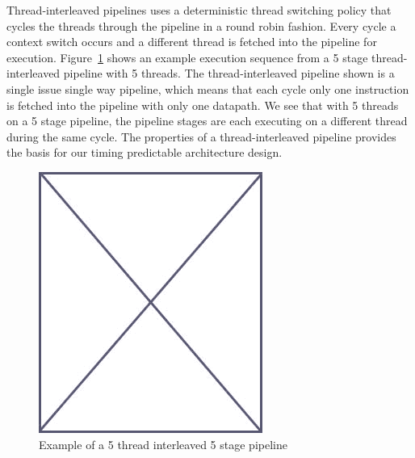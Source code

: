 Thread-interleaved pipelines uses a deterministic thread switching policy that cycles the threads through the pipeline in a round robin fashion.
Every cycle a context switch occurs and a different thread is fetched into the pipeline for execution. 
Figure~\ref{fig:execution_thread_interleaved_pipeline} shows an example execution sequence from a 5 stage thread-interleaved pipeline with 5 threads.
The thread-interleaved pipeline shown is a single issue single way pipeline, which means that each cycle only one instruction is fetched into the pipeline with only one datapath.
We see that with 5 threads on a 5 stage pipeline, the pipeline stages are each executing on a different thread during the same cycle.
The properties of a thread-interleaved pipeline provides the basis for our timing predictable architecture design.

\begin{figure}
\begin{center}
\includegraphics[scale=.4]{figs/placeholder}
\end{center}
\caption{Example of a 5 thread interleaved 5 stage pipeline}
\label{fig:execution_thread_interleaved_pipeline}
\end{figure}

